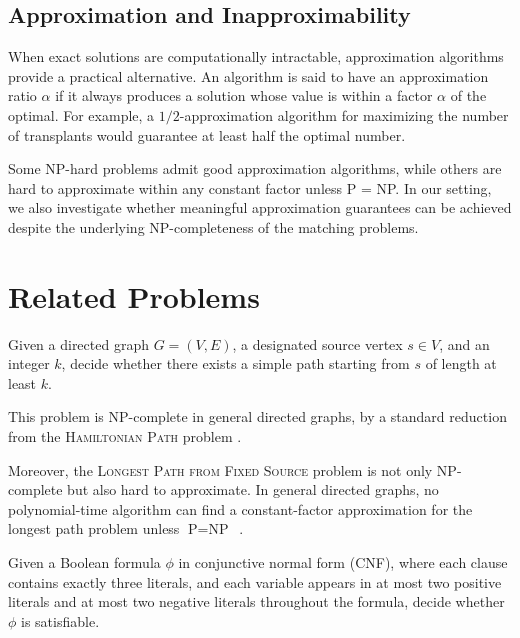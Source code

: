 \subsection*{Approximation and Inapproximability}

When exact solutions are computationally intractable, approximation algorithms provide a practical alternative. An algorithm is said to have an approximation ratio $\alpha$ if it always produces a solution whose value is within a factor $\alpha$ of the optimal. For example, a $1/2$-approximation algorithm for maximizing the number of transplants would guarantee at least half the optimal number.

Some NP-hard problems admit good approximation algorithms, while others are hard to approximate within any constant factor unless P = NP. In our setting, we also investigate whether meaningful approximation guarantees can be achieved despite the underlying NP-completeness of the matching problems.


\section{Related Problems}

\begin{problem}
\label{prob:longest_simple_path}
Given a directed graph $G = (V, E)$, a designated source vertex $s \in V$, and an integer $k$, decide whether there exists a simple path starting from $s$ of length at least $k$.
\end{problem}

This problem is NP-complete in general directed graphs, by a standard reduction from the \textsc{Hamiltonian Path} problem \cite{garey1979computers}.

Moreover, the \textsc{Longest Path from Fixed Source} problem is not only NP-complete but also hard to approximate. In general directed graphs, no polynomial-time algorithm can find a constant-factor approximation for the longest path problem unless $\text{P} = \text{NP}$~\cite{karger1997approximating}. 

\begin{problem}[2P2N-3SAT]
\label{prob:2p2n_3sat}
Given a Boolean formula $\phi$ in conjunctive normal form (CNF), where each clause contains exactly three literals, and each variable appears in at most two positive literals and at most two negative literals throughout the formula, decide whether $\phi$ is satisfiable.
\end{problem}


